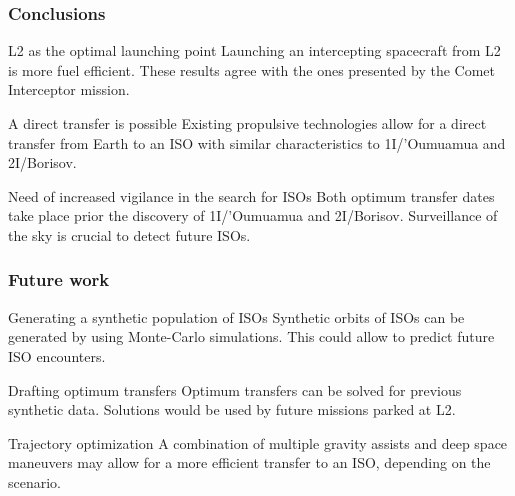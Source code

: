 \documentclass[xcolor={dvipsnames}]{beamer}
\begin{document}
\begin{frame}
\frametitle{Conclusions}

\begin{block}{L2 as the optimal launching point}
Launching an intercepting spacecraft from L2 is more fuel efficient. These
results agree with the ones presented by the Comet Interceptor mission.
\end{block}

\pause

\vspace{0.5cm}
\begin{block}{A direct transfer is possible}
Existing propulsive technologies allow for a direct transfer from Earth to an
ISO with similar characteristics to 1I/'Oumuamua and 2I/Borisov.
\end{block}

\pause

\vspace{0.5cm}
\begin{block}{Need of increased vigilance in the search for ISOs}
Both optimum transfer dates take place prior the discovery of 1I/'Oumuamua and
2I/Borisov. Surveillance of the sky is crucial to detect future ISOs.
\end{block}

\end{frame}

\begin{frame}
\frametitle{Future work}

\begin{exampleblock}{Generating a synthetic population of ISOs}
Synthetic orbits of ISOs can be generated by using Monte-Carlo simulations.
This could allow to predict future ISO encounters.
\end{exampleblock}

\pause
\vspace{0.5cm}
\begin{exampleblock}{Drafting optimum transfers}
Optimum transfers can be solved for previous synthetic data. Solutions would be
used by future missions parked at L2.
\end{exampleblock}

\pause
\vspace{0.5cm}
\begin{exampleblock}{Trajectory optimization}
A combination of multiple gravity assists and deep space maneuvers may allow for
a more efficient transfer to an ISO, depending on the scenario.
\end{exampleblock}

\end{frame}
\end{document}
